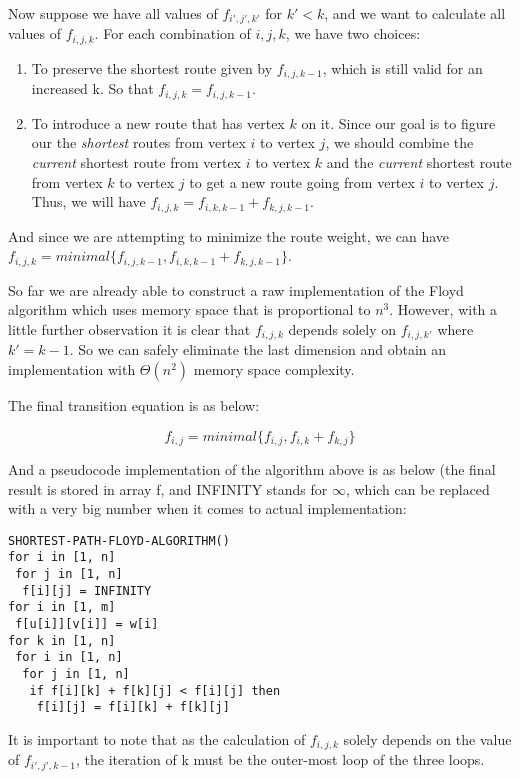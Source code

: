 \documentclass[a4paper,11pt,twocolumn]{article}
\begin{document}
Now suppose we have all values of $f_{i',j',k'}$ for $k' < k$, and we want to calculate all values of $f_{i,j,k}$. For each combination of $i, j, k$, we have two choices:

\begin{enumerate}

\item{To preserve the shortest route given by $f_{i,j,k-1}$, which is still valid for an increased k. So that $f_{i,j,k}=f_{i,j,k-1}$. }
\item{To introduce a new route that has vertex $k$ on it. Since our goal is to figure our the \emph{shortest} routes from vertex $i$ to vertex $j$, we should combine the \emph{current} shortest route from vertex $i$ to vertex $k$ and the \emph{current} shortest route from vertex $k$ to vertex $j$ to get a new route going from vertex $i$ to vertex $j$. Thus, we will have $f_{i,j,k}=f_{i,k,k-1}+f_{k,j,k-1}$. }

\end{enumerate}

And since we are attempting to minimize the route weight, we can have $f_{i,j,k}=minimal\{f_{i,j,k-1},f_{i,k,k-1}+f_{k,j,k-1}\}$.

So far we are already able to construct a raw implementation of the Floyd algorithm which uses memory space that is proportional to $n^3$. However, with a little further observation it is clear that $f_{i,j,k}$ depends solely on $f_{i,j,k'}$ where $k'=k-1$. So we can safely eliminate the last dimension and obtain an implementation with $\Theta(n^2)$ memory space complexity.

The final transition equation is as below:

$$f_{i,j}=minimal\{f_{i,j},f_{i,k}+f_{k,j}\}$$

And a pseudocode implementation of the algorithm above is as below (the final result is stored in array f, and INFINITY stands for $\infty$, which can be replaced with a very big number when it comes to actual implementation:

\begin{verbatim}
SHORTEST-PATH-FLOYD-ALGORITHM()
for i in [1, n]
 for j in [1, n]
  f[i][j] = INFINITY
for i in [1, m]
 f[u[i]][v[i]] = w[i]
for k in [1, n]
 for i in [1, n]
  for j in [1, n]
   if f[i][k] + f[k][j] < f[i][j] then
    f[i][j] = f[i][k] + f[k][j]
\end{verbatim}

It is important to note that as the calculation of $f_{i,j,k}$ solely depends on the value of $f_{i',j',k-1}$, the iteration of k must be the outer-most loop of the three loops.
\end{document}
